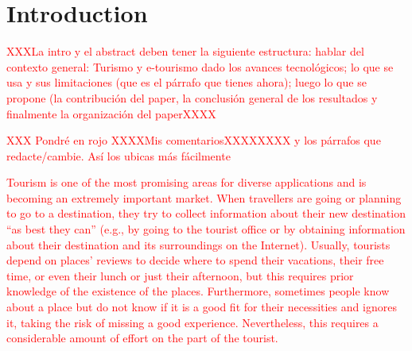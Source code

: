 \section{Introduction}
\textcolor{red}{XXXLa intro y el abstract deben tener la siguiente estructura: hablar del contexto general: Turismo y e-tourismo dado los avances tecnológicos; lo que se usa y sus limitaciones (que es el párrafo que tienes ahora); luego lo que se propone (la contribución del paper, la conclusión general de los resultados y finalmente la organización del paperXXXX}

\textcolor{red}{XXX Pondré en rojo XXXXMis comentariosXXXXXXXX y los párrafos que redacte/cambie. Así los ubicas más fácilmente}


\textcolor{red}{Tourism is one of the most promising areas for diverse applications and is becoming an extremely
important market\cite{buhalis2011tourism,murphy2013tourism,fermoso2015open,ku2015cultivating,alghamdi2016tourism,artemenko2017tourism,kazandzhieva2019tourism,jannach2020interactive}. 
When travellers are going or planning to go to a destination, they try to collect information about their new destination “as best they can” (e.g., by going to the tourist office or by obtaining information about their destination and its surroundings on the Internet). Usually, tourists depend on places' reviews to decide where to spend their vacations, their free time, or even their lunch or just their afternoon, but this requires prior knowledge of the existence of the places. Furthermore, sometimes people know about a place but do not know if it is a good fit for their necessities and ignores it, taking the risk of missing a good experience. Nevertheless, this requires a considerable amount of effort on the part of the tourist. }




